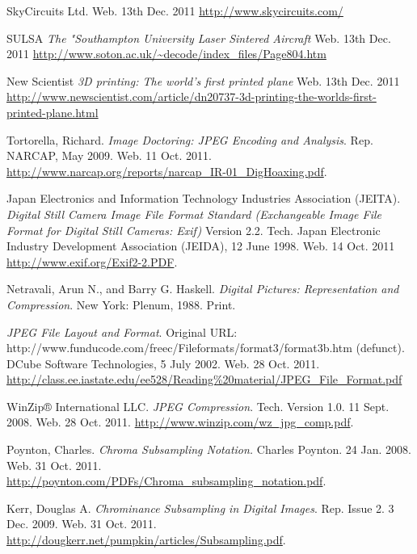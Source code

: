 

\begin{thebibliography}{9}

	 SkyCircuits Ltd. Web. 13th Dec. 2011 \url{http://www.skycircuits.com/}

	 SULSA \emph{The "Southampton University Laser Sintered Aircraft} Web. 13th Dec. 2011 \url{http://www.soton.ac.uk/~decode/index_files/Page804.htm}

	 New Scientist \emph{3D printing: The world's first printed plane} Web. 13th Dec. 2011 \url{http://www.newscientist.com/article/dn20737-3d-printing-the-worlds-first-printed-plane.html}

	 Tortorella, Richard. \emph{Image Doctoring: JPEG Encoding and Analysis}. Rep. NARCAP, May 2009. Web. 11 Oct. 2011. \url{http://www.narcap.org/reports/narcap_IR-01_DigHoaxing.pdf}.
	
	 Japan Electronics and Information Technology Industries Association (JEITA). \emph{Digital Still Camera Image File Format Standard (Exchangeable Image File Format for Digital Still Cameras: Exif)} Version 2.2. Tech. Japan Electronic Industry Development Association (JEIDA), 12 June 1998. Web. 14 Oct. 2011 \url{http://www.exif.org/Exif2-2.PDF}.
	
	 Netravali, Arun N., and Barry G. Haskell. \emph{Digital Pictures: Representation and Compression}. New York: Plenum, 1988. Print. 
	
	 \emph{JPEG File Layout and Format}. Original URL: \\http://www.funducode.com/freec/Fileformats/format3/format3b.htm (defunct).\\DCube Software Technologies, 5 July 2002. Web. 28 Oct. 2011. \url{http://class.ee.iastate.edu/ee528/Reading%20material/JPEG_File_Format.pdf}
	
	 WinZip® International LLC. \emph{JPEG Compression}. Tech. Version 1.0. 11 Sept. 2008. Web. 28 Oct. 2011. \url{http://www.winzip.com/wz_jpg_comp.pdf}.
	
	 Poynton, Charles. \emph{Chroma Subsampling Notation.} Charles Poynton. 24 Jan. 2008. Web. 31 Oct. 2011. \url{http://poynton.com/PDFs/Chroma_subsampling_notation.pdf}.
	
	 Kerr, Douglas A. \emph{Chrominance Subsampling in Digital Images}. Rep. Issue 2. 3 Dec. 2009. Web. 31 Oct. 2011. \url{http://dougkerr.net/pumpkin/articles/Subsampling.pdf}.
	

\end{thebibliography}
